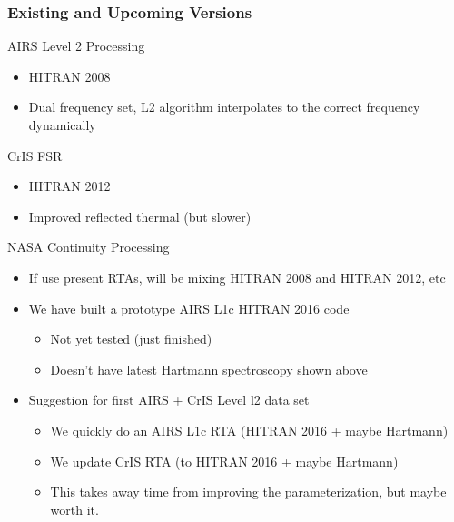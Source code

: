 \documentclass[10pt,t]{beamer}
\begin{document}
\begin{frame}[shrink=20]
  \frametitle{Existing and Upcoming Versions}

  \begin{block}{AIRS Level 2 Processing}
    \begin{itemize}
    \item HITRAN 2008
    \item Dual frequency set, L2 algorithm interpolates to the correct frequency  dynamically 
     \end{itemize}
  \end{block}
  \begin{block}{CrIS FSR}
    \begin{itemize}
    \item HITRAN 2012
    \item Improved reflected thermal (but slower)
     \end{itemize}
  \end{block}
  \begin{block}{NASA Continuity Processing}
    \begin{itemize}
    \item If use present RTAs, will be mixing HITRAN 2008 and HITRAN 2012, etc
    \item We have built a prototype AIRS L1c HITRAN 2016 code
      \begin{itemize}
      \item Not yet tested (just finished)
      \item Doesn't have latest Hartmann spectroscopy shown above
      \end{itemize}
    \item Suggestion for first AIRS + CrIS Level l2 data set
      \begin{itemize}
      \item We quickly do an AIRS L1c RTA (HITRAN 2016 + maybe Hartmann)
      \item We update CrIS RTA (to HITRAN 2016 + maybe Hartmann)
      \item This takes away time from improving the parameterization, but maybe worth it.
      \end{itemize}
  
      

    \end{itemize}
  \end{block}
  
  
\end{frame}
\end{document}
